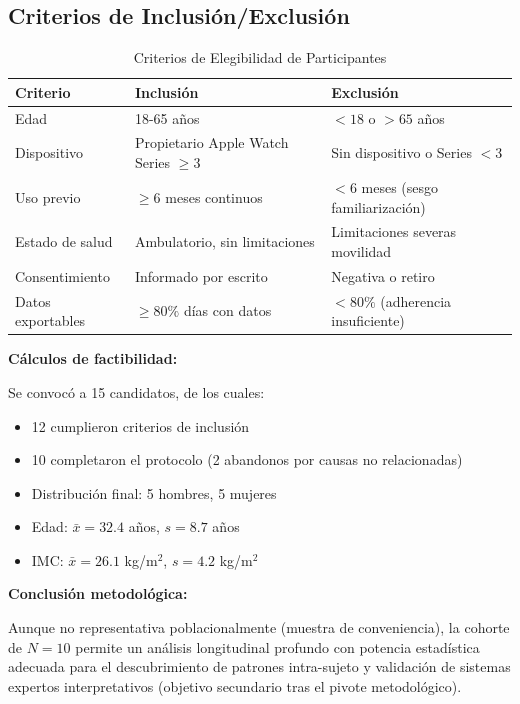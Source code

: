 \documentclass[12pt,letterpaper,twoside]{report}
\begin{document}
\subsection{Criterios de Inclusión/Exclusión}

\begin{table}[H]
\centering
\caption{Criterios de Elegibilidad de Participantes}
\label{tab:eligibility}
\begin{tabular}{@{}p{4cm}p{5cm}p{5cm}@{}}
\toprule
\textbf{Criterio} & \textbf{Inclusión} & \textbf{Exclusión} \\
\midrule
Edad & 18-65 años & $<18$ o $>65$ años \\
Dispositivo & Propietario Apple Watch Series $\geq 3$ & Sin dispositivo o Series $<3$ \\
Uso previo & $\geq 6$ meses continuos & $<6$ meses (sesgo familiarización) \\
Estado de salud & Ambulatorio, sin limitaciones & Limitaciones severas movilidad \\
Consentimiento & Informado por escrito & Negativa o retiro \\
Datos exportables & $\geq 80\%$ días con datos & $<80\%$ (adherencia insuficiente) \\
\bottomrule
\end{tabular}
\end{table}

\begin{calculobox}
\textbf{Cálculos de factibilidad:}

Se convocó a 15 candidatos, de los cuales:
\begin{itemize}[noitemsep]
    \item 12 cumplieron criterios de inclusión
    \item 10 completaron el protocolo (2 abandonos por causas no relacionadas)
    \item Distribución final: 5 hombres, 5 mujeres
    \item Edad: $\bar{x}=32.4$ años, $s=8.7$ años
    \item IMC: $\bar{x}=26.1$ kg/m$^2$, $s=4.2$ kg/m$^2$
\end{itemize}
\end{calculobox}

\begin{conclusionbox}
\textbf{Conclusión metodológica:}

Aunque no representativa poblacionalmente (muestra de conveniencia), la cohorte de $N=10$ permite un análisis longitudinal profundo con potencia estadística adecuada para el descubrimiento de patrones intra-sujeto y validación de sistemas expertos interpretativos (objetivo secundario tras el pivote metodológico).
\end{conclusionbox}
\end{document}
